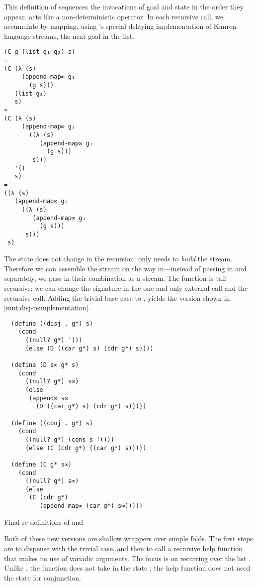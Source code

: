 \documentclass[sigplan,balance=true,pbalance=true,natbib=false]{acmart}
\begin{document}
This definition of  sequences the invocations of goal
and state in the order they appear.  acts like
a non-deterministic  operator. In each recursive
call, we accumulate by mapping, using 's
special delaying implementation of Kanren-language streams, the next
goal in the list.

\begin{verbatim}
(C g (list g₁ g₂) s)
=
(C (λ (s)
     (append-map∞ g₁
       (g s)))
   (list g₂)
   s)
=
(C (λ (s)
     (append-map∞ g₂
       ((λ (s)
          (append-map∞ g₁
            (g s)))
        s)))
   '()
   s)
=
((λ (s)
   (append-map∞ g₂
     ((λ (s)
        (append-map∞ g₁
          (g s)))
      s)))
 s)
\end{verbatim}

The state does not change in the recursion:  only needs
 to \emph{build} the stream. Therefore we can assemble
the stream on the way in---instead of passing in  and
 separately, we pass in their combination as a stream.
The function is tail recursive; we can change the signature in the one
and only external call and the recursive call. Adding the trivial base
case to , yields the version shown in
\cref{mnt:disj-reimplementation}.

\begin{listing}
\begin{verbatim}
  (define ((disj . g*) s)
    (cond
      ((null? g*) '())
      (else (D ((car g*) s) (cdr g*) s))))

  (define (D s∞ g* s)
    (cond
      ((null? g*) s∞)
      (else
       (append∞ s∞
         (D ((car g*) s) (cdr g*) s)))))

  (define ((conj . g*) s)
    (cond
      ((null? g*) (cons s '()))
      (else (C (cdr g*) ((car g*) s)))))

  (define (C g* s∞)
    (cond
      ((null? g*) s∞)
      (else
       (C (cdr g*)
          (append-map∞ (car g*) s∞)))))
\end{verbatim}
  \caption{Final re-definitions of  and }\label{mnt:disj-reimplementation}
\end{listing}

Both of these new versions are shallow wrappers over simple folds. The
first steps are to dispense with the trivial case, and then to call a
recursive help function that makes no use of variadic arguments. The
focus is on recurring over the list . Unlike
, the function  does not take in the state
; the help function does not need the state for
conjunction.
\end{document}
